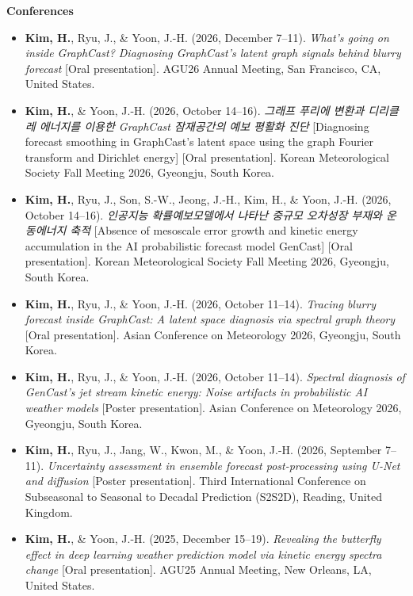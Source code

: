 \noindent\textbf{Conferences}
\vspace{-0.5em}
\begin{itemize}[itemsep=0pt, parsep=0pt]
    \item \textbf{Kim, H.}, Ryu, J., \& Yoon, J.-H. (2026, December 7--11). \textit{What's going on inside GraphCast? Diagnosing GraphCast's latent graph signals behind blurry forecast} [Oral presentation]. AGU26 Annual Meeting, San Francisco, CA, United States.

    \item \textbf{Kim, H.}, \& Yoon, J.-H. (2026, October 14--16). \textit{그래프 푸리에 변환과 디리클레 에너지를 이용한 GraphCast 잠재공간의 예보 평활화 진단} [Diagnosing forecast smoothing in GraphCast's latent space using the graph Fourier transform and Dirichlet energy] [Oral presentation]. Korean Meteorological Society Fall Meeting 2026, Gyeongju, South Korea.

    \item \textbf{Kim, H.}, Ryu, J., Son, S.-W., Jeong, J.-H., Kim, H., \& Yoon, J.-H. (2026, October 14--16). \textit{인공지능 확률예보모델에서 나타난 중규모 오차성장 부재와 운동에너지 축적} [Absence of mesoscale error growth and kinetic energy accumulation in the AI probabilistic forecast model GenCast] [Oral presentation]. Korean Meteorological Society Fall Meeting 2026, Gyeongju, South Korea.

    \item \textbf{Kim, H.}, Ryu, J., \& Yoon, J.-H. (2026, October 11--14). \textit{Tracing blurry forecast inside GraphCast: A latent space diagnosis via spectral graph theory} [Oral presentation]. Asian Conference on Meteorology 2026, Gyeongju, South Korea.

    \item \textbf{Kim, H.}, Ryu, J., \& Yoon, J.-H. (2026, October 11--14). \textit{Spectral diagnosis of GenCast's jet stream kinetic energy: Noise artifacts in probabilistic AI weather models} [Poster presentation]. Asian Conference on Meteorology 2026, Gyeongju, South Korea.

    \item \textbf{Kim, H.}, Ryu, J., Jang, W., Kwon, M., \& Yoon, J.-H. (2026, September 7--11). \textit{Uncertainty assessment in ensemble forecast post-processing using U-Net and diffusion} [Poster presentation]. Third International Conference on Subseasonal to Seasonal to Decadal Prediction (S2S2D), Reading, United Kingdom.

    \item \textbf{Kim, H.}, \& Yoon, J.-H. (2025, December 15--19). \textit{Revealing the butterfly effect in deep learning weather prediction model via kinetic energy spectra change} [Oral presentation]. AGU25 Annual Meeting, New Orleans, LA, United States.
\end{itemize}